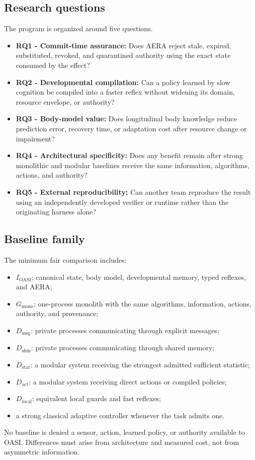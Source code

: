\documentclass[journal,10pt]{IEEEtran}
\newcommand{\OASI}{\textsc{OASI}}
\newcommand{\AERA}{\textsc{AERA}}
\begin{document}
\subsection{Research questions}
The program is organized around five questions.
\begin{itemize}
  \item \textbf{RQ1 - Commit-time assurance:} Does \AERA{} reject stale, expired, substituted, revoked, and quarantined authority using the exact state consumed by the effect?
  \item \textbf{RQ2 - Developmental compilation:} Can a policy learned by slow cognition be compiled into a faster reflex without widening its domain, resource envelope, or authority?
  \item \textbf{RQ3 - Body-model value:} Does longitudinal body knowledge reduce prediction error, recovery time, or adaptation cost after resource change or impairment?
  \item \textbf{RQ4 - Architectural specificity:} Does any benefit remain after strong monolithic and modular baselines receive the same information, algorithms, actions, and authority?
  \item \textbf{RQ5 - External reproducibility:} Can another team reproduce the result using an independently developed verifier or runtime rather than the originating harness alone?
\end{itemize}

\subsection{Baseline family}
The minimum fair comparison includes:
\begin{itemize}
  \item $I_{\mathrm{OASI}}$: canonical state, body model, developmental memory, typed reflexes, and \AERA;
  \item $G_{\mathrm{mono}}$: one-process monolith with the same algorithms, information, actions, authority, and provenance;
  \item $D_{\mathrm{msg}}$: private processes communicating through explicit messages;
  \item $D_{\mathrm{shm}}$: private processes communicating through shared memory;
  \item $D_{\mathrm{stat}}$: a modular system receiving the strongest admitted sufficient statistic;
  \item $D_{\mathrm{act}}$: a modular system receiving direct actions or compiled policies;
  \item $D_{\mathrm{local}}$: equivalent local guards and fast reflexes;
  \item a strong classical adaptive controller whenever the task admits one.
\end{itemize}
No baseline is denied a sensor, action, learned policy, or authority available to \OASI{}. Differences must arise from architecture and measured cost, not from asymmetric information.
\end{document}
